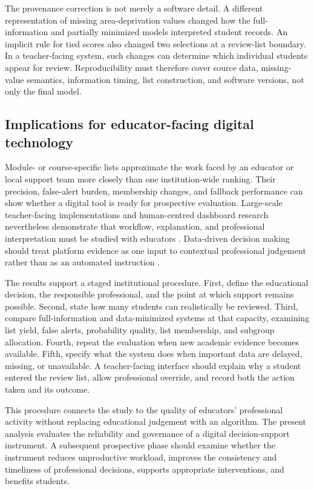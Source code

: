 \documentclass[education,article,submit,moreauthors]{Definitions/mdpi}
\begin{document}
The provenance correction is not merely a software detail. A different representation of missing area-deprivation values changed how the full-information and partially minimized models interpreted student records. An implicit rule for tied scores also changed two selections at a review-list boundary. In a teacher-facing system, such changes can determine which individual students appear for review. Reproducibility must therefore cover source data, missing-value semantics, information timing, list construction, and software versions, not only the final model.

\subsection{Implications for educator-facing digital technology}

Module- or course-specific lists approximate the work faced by an educator or local support team more closely than one institution-wide ranking. Their precision, false-alert burden, membership changes, and fallback performance can show whether a digital tool is ready for prospective evaluation. Large-scale teacher-facing implementations and human-centred dashboard research nevertheless demonstrate that workflow, explanation, and professional interpretation must be studied with educators \citep{herodotou2019teachers,alfredo2024dashboard}. Data-driven decision making should treat platform evidence as one input to contextual professional judgement rather than as an automated instruction \citep{evenstein2026trusting}.

The results support a staged institutional procedure. First, define the educational decision, the responsible professional, and the point at which support remains possible. Second, state how many students can realistically be reviewed. Third, compare full-information and data-minimized systems at that capacity, examining list yield, false alerts, probability quality, list membership, and subgroup allocation. Fourth, repeat the evaluation when new academic evidence becomes available. Fifth, specify what the system does when important data are delayed, missing, or unavailable. A teacher-facing interface should explain why a student entered the review list, allow professional override, and record both the action taken and its outcome.

This procedure connects the study to the quality of educators' professional activity without replacing educational judgement with an algorithm. The present analysis evaluates the reliability and governance of a digital decision-support instrument. A subsequent prospective phase should examine whether the instrument reduces unproductive workload, improves the consistency and timeliness of professional decisions, supports appropriate interventions, and benefits students.
\end{document}
